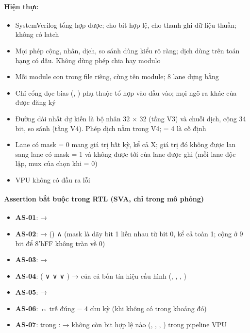 \documentclass[10pt,a4paper]{article}
\begin{document}
\paragraph{Hiện thực}\label{par:8-1}
\begin{itemize}
\item SystemVerilog tổng hợp được;  cho bit hợp lệ,  cho thanh ghi dữ liệu thuần; không có latch
\item Mọi phép cộng, nhân, dịch, so sánh dùng kiểu  rõ ràng; dịch dùng \sig{>>>} trên toán hạng có dấu. Không dùng phép chia hay modulo
\item Mỗi module con trong file riêng, cùng tên module; 8 lane dựng bằng 
\item Chỉ cổng đọc bias (, ) phụ thuộc tổ hợp vào đầu vào; mọi ngõ ra khác của  được đăng ký
\item Đường dài nhất dự kiến là bộ nhân 32 × 32 (tầng V3) và chuỗi dịch, cộng 34 bit, so sánh (tầng V4). Phép dịch nằm trong V4;  = 4 là cố định
\item Lane có mask = 0 mang giá trị bất kỳ, kể cả X; giá trị đó không được lan sang lane có mask = 1 và không được tới  của lane được ghi (mỗi lane độc lập, mux của  chọn  khi  = 0)
\item VPU không có đầu ra lỗi
\end{itemize}

\paragraph{Assertion bắt buộc trong RTL (SVA, chỉ trong mô phỏng)}\label{par:8-2}
\begin{itemize}
\item \textbf{AS-01}:  → 
\item \textbf{AS-02}:  → () ∧  (mask là dãy bit 1 liền nhau từ bit 0, kể cả toàn 1; cộng ở 9 bit để 8'hFF không tràn về 0)
\item \textbf{AS-03}:  → 
\item \textbf{AS-04}: ( ∨  ∨  ∨ ) →  của cả bốn tín hiệu cấu hình (, , , )
\item \textbf{AS-05}:  → 
\item \textbf{AS-06}:  ↔  trễ đúng  = 4 chu kỳ (khi không có  trong khoảng đó)
\item \textbf{AS-07}: trong :  → không còn bit hợp lệ nào (, , , ) trong pipeline VPU
\end{itemize}
\end{document}

